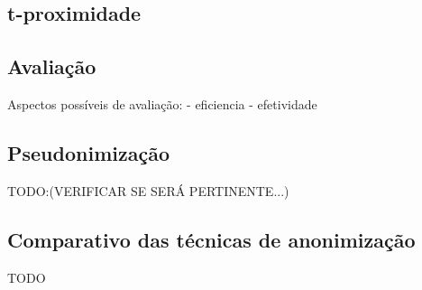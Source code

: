 \subsection{t-proximidade}

\subsection{Avaliação}
Aspectos possíveis de avaliação:
    - eficiencia
    - efetividade

\subsection{Pseudonimização}
TODO:(VERIFICAR SE SERÁ PERTINENTE...)

\subsection{Comparativo das técnicas de anonimização}
TODO







